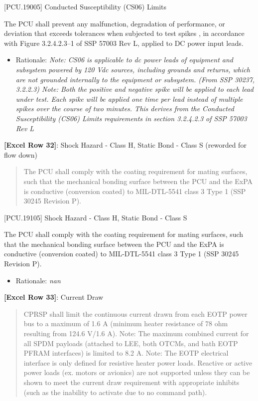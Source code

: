 [PCU.19005] Conducted Susceptibility (CS06) Limits

The PCU shall prevent any malfunction, degradation of performance, or deviation that exceeds tolerances when subjected to test spikes , in accordance with Figure 3.2.4.2.3--1 of SSP 57003 Rev L, applied to DC power input leads.

\begin{itemize}
\item{} Rationale: \emph{Note: CS06 is applicable to dc power leads of equipment and subsystem powered by 120 Vdc sources, including grounds and returns, which are not grounded internally to the equipment or subsystem. (From SSP 30237, 3.2.2.3) Note: Both the positive and negative spike will be applied to each lead under test. Each spike will be applied one time per lead instead of multiple spikes over the course of two minutes. This derives from the Conducted Susceptibility (CS06) Limits requirements in section 3.2.4.2.3 of SSP 57003 Rev L}

\end{itemize}

\textbf{[Excel Row 32]}: Shock Hazard - Class H, Static Bond - Class S (reworded for flow down)

\begin{quote}
The PCU shall comply with the coating requirement for mating surfaces, such that the mechanical bonding surface between the PCU and the ExPA is conductive (conversion coated) to MIL-DTL-5541 class 3 Type 1 (SSP 30245 Revision P).
\end{quote}

[PCU.19105] Shock Hazard - Class H, Static Bond - Class S

The PCU shall comply with the coating requirement for mating surfaces, such that the mechanical bonding surface between the PCU and the ExPA is conductive (conversion coated) to MIL-DTL-5541 class 3 Type 1 (SSP 30245 Revision P).

\begin{itemize}
\item{} Rationale: \emph{nan}

\end{itemize}

\textbf{[Excel Row 33]}: Current Draw

\begin{quote}
CPRSP shall limit the continuous current drawn from each EOTP power bus to a maximum of 1.6 A (minimum heater resistance of 78 ohm resulting from 124.6 V\slash 1.6 A).
Note: The maximum combined current for all SPDM payloads (attached to LEE, both OTCMs, and bath EOTP PFRAM interfaces) is limited to 8.2 A.
Note: The EOTP electrical interface is only defined for resistive heater power loads. Reactive or active power loads (ex. motors or avionics) are not supported unless they can be shown to meet the current draw requirement with appropriate inhibits (such as the inability to activate due to no command path).
\end{quote}

